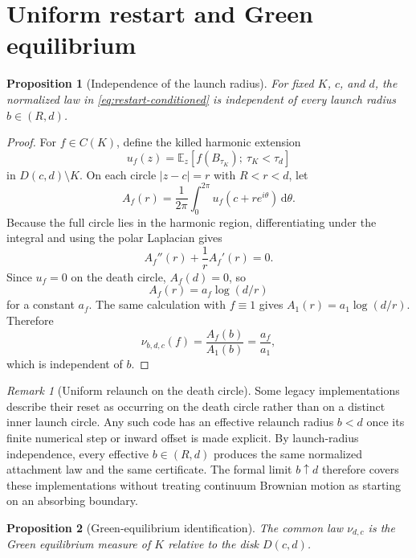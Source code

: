 \documentclass[11pt]{article}
\theoremstyle{mainthm}
\newtheorem{proposition}[proposition]{Proposition}
\theoremstyle{definition}
\theoremstyle{remark}
\newtheorem{remark}[remark]{Remark}
\newcommand{\E}{\mathbb E}
\newcommand{\dd}{\,\mathrm d}
\begin{document}
\section{Uniform restart and Green equilibrium}

\begin{proposition}[Independence of the launch radius]
\label{prop:birth-independent}
For fixed $K$, $c$, and $d$, the normalized law in \eqref{eq:restart-conditioned} is independent of every launch radius $b\in(R,d)$.
\end{proposition}

\begin{proof}
For $f\in C(K)$, define the killed harmonic extension
\[
  u_f(z)=\E_z[f(B_{\tau_K});\ \tau_K<\tau_d]
\]
in $D(c,d)\setminus K$. On each circle $|z-c|=r$ with $R<r<d$, let
\[
  A_f(r)=\frac{1}{2\pi}\int_0^{2\pi}
  u_f(c+re^{i\theta})\dd\theta.
\]
Because the full circle lies in the harmonic region, differentiating under the integral and using the polar Laplacian gives
\[
  A_f''(r)+\frac1rA_f'(r)=0.
\]
Since $u_f=0$ on the death circle, $A_f(d)=0$, so
\[
  A_f(r)=a_f\log(d/r)
\]
for a constant $a_f$. The same calculation with $f\equiv1$ gives $A_1(r)=a_1\log(d/r)$. Therefore
\[
  \nu_{b,d,c}(f)=\frac{A_f(b)}{A_1(b)}=\frac{a_f}{a_1},
\]
which is independent of $b$.
\end{proof}

\begin{remark}[Uniform relaunch on the death circle]
Some legacy implementations describe their reset as occurring on the death circle rather than on a distinct inner launch circle. Any such code has an effective relaunch radius $b<d$ once its finite numerical step or inward offset is made explicit. By launch-radius independence, every effective $b\in(R,d)$ produces the same normalized attachment law and the same certificate. The formal limit $b\uparrow d$ therefore covers these implementations without treating continuum Brownian motion as starting on an absorbing boundary.
\end{remark}

\begin{proposition}[Green-equilibrium identification]
\label{prop:green-equilibrium}
The common law $\nu_{d,c}$ is the Green equilibrium measure of $K$ relative to the disk $D(c,d)$.
\end{proposition}
\end{document}
